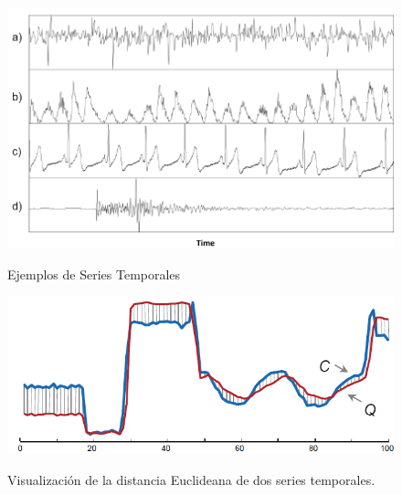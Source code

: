 \begin{figure}[h]
\vspace{0.1in}
\begin{center}
\includegraphics[scale=0.6]{timeSeries.png}\\%
\end{center}
\caption{Ejemplos de Series Temporales}
\label{arm:fig1}
\end{figure}
\begin{figure}[h]
\vspace{0.1in}
\begin{center}
\includegraphics[scale=0.6]{euclidean.png}\\
\end{center}
\caption{Visualizaci\'on de la distancia Euclideana de dos series temporales.}
\label{arm:fig2}
\end{figure}
